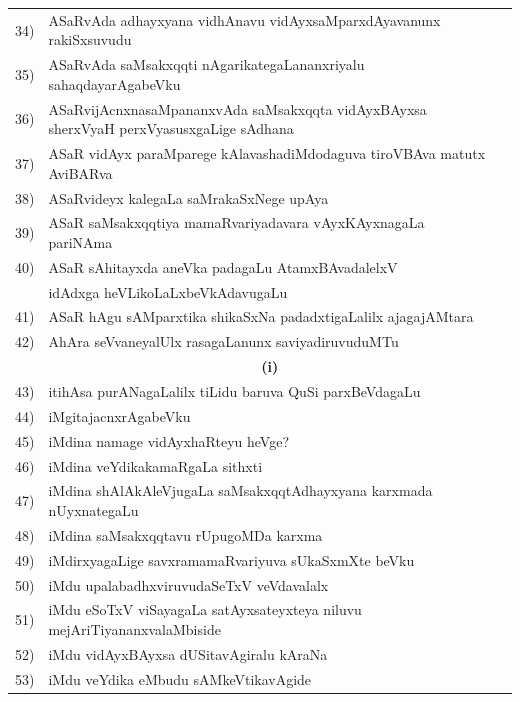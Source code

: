 \begin{longtable}{@{}cp{7.4cm}r}
34) & ASaRvAda adhayxyana vidhAnavu vidAyxsaMparxdAyavanunx rakiSxsuvudu & \pageref{page48}\\
35) & ASaRvAda saMsakxqqti nAgarikategaLananxriyalu sahaqdayarAgabeVku & \pageref{page51a}\\
36) & ASaRvijAcnxnasaMpananxvAda saMsakxqqta vidAyxBAyxsa sherxVyaH perxVyasusxgaLige sAdhana & \pageref{page42b}\\
37) & ASaR vidAyx paraMparege kAlavashadiMdodaguva tiroVBAva matutx AviBARva & \pageref{62a}\\%
38) & ASaRvideyx kalegaLa saMrakaSxNege upAya & \pageref{page50a} \\
39) & ASaR saMsakxqqtiya mamaRvariyadavara vAyxKAyxnagaLa pariNAma & \pageref{page24}\\
40) & ASaR sAhitayxda aneVka padagaLu AtamxBAvadalelxV & \\
    & idAdxga heVLikoLaLxbeVkAdavugaLu   & \pageref{page246}\\
41) & ASaR hAgu sAMparxtika shikaSxNa padadxtigaLalilx ajagajAMtara  & \pageref{page28}\\
42) & AhAra seVvaneyalUlx rasagaLanunx saviyadiruvuduMTu & \pageref{page221a}\\[0.3cm]
    & \multicolumn{1}{c}{\textbf{(i)}} & \\[0.3cm]
43) & itihAsa purANagaLalilx tiLidu baruva QuSi parxBeVdagaLu &  \pageref{page62}\\
44) & iMgitajacnxrAgabeVku  & \pageref{page122a}\\
45) & iMdina namage vidAyxhaRteyu heVge? & \pageref{page109a}\\
46) & iMdina veYdikakamaRgaLa sithxti & \pageref{page208}\\
47) & iMdina shAlAkAleVjugaLa saMsakxqqtAdhayxyana karxmada nUyxnategaLu & \pageref{page43}\\
48) & iMdina saMsakxqqtavu rUpugoMDa karxma & \pageref{page12}\\
49) & iMdirxyagaLige savxramamaRvariyuva sUkaSxmXte beVku & \pageref{page125}\\
50) & iMdu upalabadhxviruvudaSeTxV veVdavalalx & \pageref{page134}\\
51) & iMdu eSoTxV viSayagaLa satAyxsateyxteya niluvu mejAriTiyananxvalaMbiside & \pageref{page215a}\\
52) & iMdu vidAyxBAyxsa dUSitavAgiralu kAraNa & \pageref{page41e}\\
53) & iMdu veYdika eMbudu sAMkeVtikavAgide & \pageref{page206}\\ [0.3cm]  

\end{longtable}
